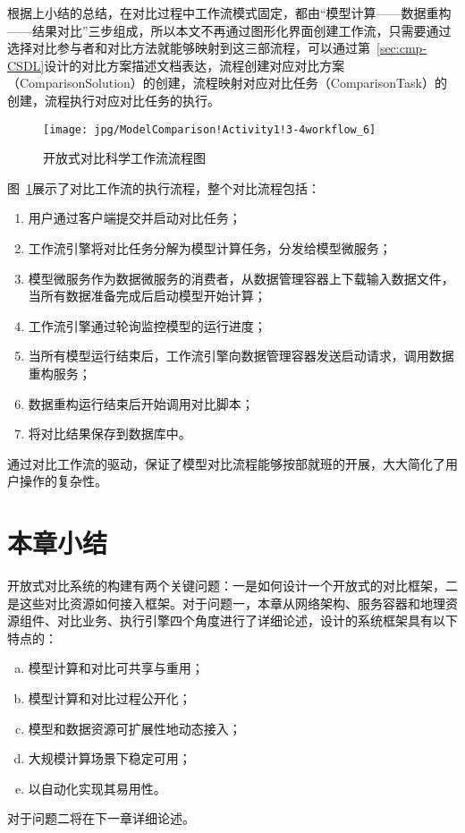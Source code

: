 根据上小结的总结，在对比过程中工作流模式固定，都由“模型计算——数据重构——结果对比”三步组成，所以本文不再通过图形化界面创建工作流，只需要通过选择对比参与者和对比方法就能够映射到这三部流程，可以通过第~\ref{sec:cmp-CSDL}设计的对比方案描述文档表达，流程创建对应对比方案（ComparisonSolution）的创建，流程映射对应对比任务（ComparisonTask）的创建，流程执行对应对比任务的执行。

\begin{figure}[!htbp]
    \centering
    \texttt{[image: jpg/ModelComparison!Activity1!3-4workflow\_6]}
    \caption{开放式对比科学工作流流程图}
    \label{fig:workflow}
\end{figure}

图~\ref{fig:workflow}展示了对比工作流的执行流程，整个对比流程包括：
\begin{enumerate}[(1)]
    \item 用户通过客户端提交并启动对比任务；
    \item 工作流引擎将对比任务分解为模型计算任务，分发给模型微服务；
    \item 模型微服务作为数据微服务的消费者，从数据管理容器上下载输入数据文件，当所有数据准备完成后启动模型开始计算；
    \item 工作流引擎通过轮询监控模型的运行进度；
    \item 当所有模型运行结束后，工作流引擎向数据管理容器发送启动请求，调用数据重构服务；
    \item 数据重构运行结束后开始调用对比脚本；
    \item 将对比结果保存到数据库中。
\end{enumerate}

通过对比工作流的驱动，保证了模型对比流程能够按部就班的开展，大大简化了用户操作的复杂性。

\section{本章小结}
开放式对比系统的构建有两个关键问题：一是如何设计一个开放式的对比框架，二是这些对比资源如何接入框架。对于问题一，本章从网络架构、服务容器和地理资源组件、对比业务、执行引擎四个角度进行了详细论述，设计的系统框架具有以下特点的：
\begin{enumerate}[(a)]
    \item 模型计算和对比可共享与重用；
    \item 模型计算和对比过程公开化；
    \item 模型和数据资源可扩展性地动态接入；
    \item 大规模计算场景下稳定可用；
    \item 以自动化实现其易用性。
\end{enumerate} 

对于问题二将在下一章详细论述。